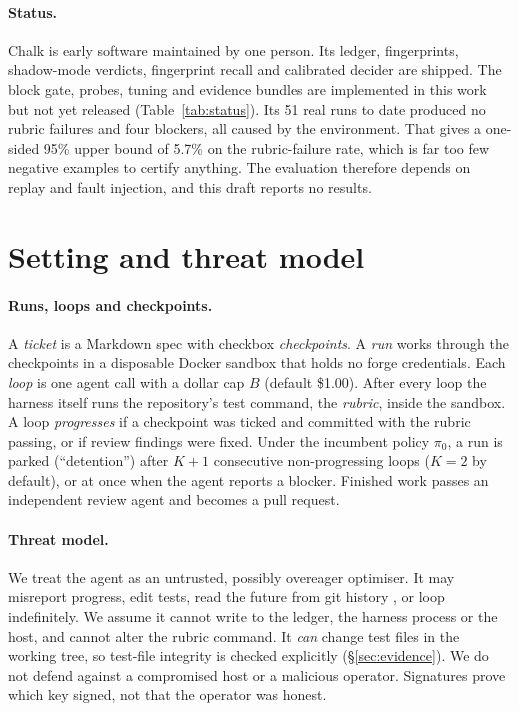 \documentclass[11pt]{article}
\theoremstyle{remark}
\begin{document}
\paragraph{Status.}
Chalk is early software maintained by one person. Its ledger, fingerprints, shadow-mode verdicts, fingerprint recall and calibrated decider are shipped. The block gate, probes, tuning and evidence bundles are implemented in this work but not yet released (Table~\ref{tab:status}). Its 51 real runs to date produced no rubric failures and four blockers, all caused by the environment. That gives a one-sided 95\% upper bound of 5.7\% on the rubric-failure rate, which is far too few negative examples to certify anything. The evaluation therefore depends on replay and fault injection, and this draft reports no results.

\section{Setting and threat model}
\label{sec:setting}

\paragraph{Runs, loops and checkpoints.}
A \emph{ticket} is a Markdown spec with checkbox \emph{checkpoints}. A \emph{run} works through the checkpoints in a disposable Docker sandbox that holds no forge credentials. Each \emph{loop} is one agent call with a dollar cap $B$ (default \$1.00). After every loop the harness itself runs the repository's test command, the \emph{rubric}, inside the sandbox. A loop \emph{progresses} if a checkpoint was ticked and committed with the rubric passing, or if review findings were fixed. Under the incumbent policy $\pi_0$, a run is parked (``detention'') after $K{+}1$ consecutive non-progressing loops ($K=2$ by default), or at once when the agent reports a blocker. Finished work passes an independent review agent and becomes a pull request.

\paragraph{Threat model.}
We treat the agent as an untrusted, possibly overeager optimiser. It may misreport progress, edit tests, read the future from git history \citep{sweprov2026}, or loop indefinitely. We assume it cannot write to the ledger, the harness process or the host, and cannot alter the rubric command. It \emph{can} change test files in the working tree, so test-file integrity is checked explicitly (\S\ref{sec:evidence}). We do not defend against a compromised host or a malicious operator. Signatures prove which key signed, not that the operator was honest.
\end{document}
